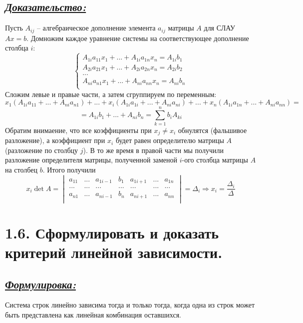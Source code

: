 \documentclass{article}
\begin{document}
\subsection*{\Large \underline{\textit{Доказательство: }}}
Пусть $A_{ij}$ -- алгебраическое дополнение элемента $a_{ij}$ матрицы $A$ для СЛАУ $Ax = b$. Домножим каждое уравнение системы на соответствующее дополнение столбца $i$:
$$
\begin{cases}
A_{1i}a_{11}x_1 + ... + A_{1i}a_{1n}x_n = A_{1i}b_1 \\
A_{2i}a_{21}x_1 + ... + A_{2i}a_{2n}x_n = A_{2i}b_2 \\
... \\
A_{ni}a_{n1}x_1 + ... + A_{ni}a_{nn}x_n = A_{ni}b_n \\
\end{cases}
$$
Сложим левые и правые части, а затем сгруппируем по переменным:
$$
x_1(A_{1i}a_{11} + ... + A_{ni}a_{n1}) + ... + x_i(A_{1i}a_{1i} + ... + A_{ni}a_{ni}) + ... + x_n(A_{1i}a_{1n} + ... + A_{ni}a_{nn}) =
$$
$$
= A_{1i}b_1 + ... + A_{ni}b_n = \sum_{k = 1}^{n}b_iA_{ki}
$$
Обратим внимаение, что все коэффициенты при $x_j \ne x_i$ обнулятся (фальшивое разложение), а коэффициент при $x_i$ будет равен определителю матрицы $A$ (разложение по столбцу $j$). В то же время в правой части мы получили разложение определителя матрицы, полученной заменой $i$-ого столбца матрицы $A$ на столбец $b$. Итого получили 
$$
x_i \det{A} =
\begin{vmatrix}
a_{11} & ... & a_{1i-1} & b_1 & a_{1i+1} & ... & a_{1n} \\
... & ... & ... & ... & ... & ... & ... \\
a_{n1} & ... & a_{ni-1} & b_n & a_{ni+1} & ... & a_{nn} \\
\end{vmatrix}
= \Delta_i \Rightarrow x_i = \frac{\Delta_i}{\Delta}
$$

\section*{\LARGE 1.6. Сформулировать и доказать критерий линейной зависимости. }
\subsection*{\Large \underline{\textit{Формулировка: }}}
Система строк линейно зависима тогда и только тогда, когда одна из строк может быть представлена как линейная комбинация оставшихся.
\end{document}
